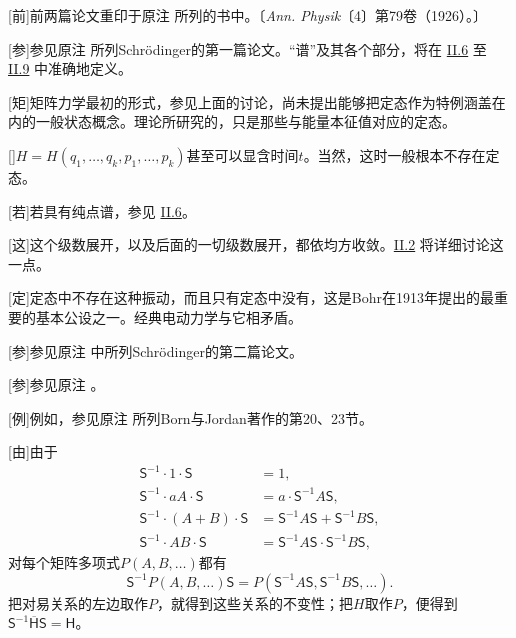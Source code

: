 \documentclass[fontsize=13pt,twoside,openany,headings=normal,parskip=false,bookmarkpackage=false,DIV=calc]{scrbook}
\begin{document}
[前]{前两篇论文重印于原注 \hyperlink{note-9}{} 所列的书中。〔\emph{Ann. Physik}〔4〕第79卷（1926）。〕}

[参]{参见原注 \hyperlink{note-16}{} 所列Schrödinger的第一篇论文。“谱”及其各个部分，将在 \hyperref[sec:II.6]{II.6} 至 \hyperref[sec:II.9]{II.9} 中准确地定义。}

[矩]{矩阵力学最初的形式，参见上面的讨论，尚未提出能够把定态作为特例涵盖在内的一般状态概念。\hypertarget{origpage-240}{}\label{origpage-240}理论所研究的，只是那些与能量本征值对应的定态。}

[]{$H=H(q_1,\allowbreak \ldots,\allowbreak q_k,\allowbreak p_1,\allowbreak \ldots,\allowbreak p_k)$甚至可以显含时间$t$。当然，这时一般根本不存在定态。}

[若]{若具有纯点谱，参见 \hyperref[sec:II.6]{II.6}。}

[这]{这个级数展开，以及后面的一切级数展开，都依均方收敛。\hyperref[sec:II.2]{II.2} 将详细讨论这一点。}

[定]{定态中不存在这种振动，而且只有定态中没有，这是Bohr在1913年提出的最重要的基本公设之一。经典电动力学与它相矛盾。}

[参]{参见原注 \hyperlink{note-16}{} 中所列Schrödinger的第二篇论文。}

[参]{参见原注 \hyperlink{note-7}{}。}

[例]{例如，参见原注 \hyperlink{note-1}{} 所列Born与Jordan著作的第20、23节。}

[由]{由于
\begin{align*}
\mathsf S^{-1}\cdot1\cdot\mathsf S&=1,\\
\mathsf S^{-1}\cdot aA\cdot\mathsf S&=a\cdot\mathsf S^{-1}A\mathsf S,\\
\mathsf S^{-1}\cdot(A+B)\cdot\mathsf S&=\mathsf S^{-1}A\mathsf S+\mathsf S^{-1}B\mathsf S,\\
\mathsf S^{-1}\cdot AB\cdot\mathsf S&=\mathsf S^{-1}A\mathsf S\cdot\mathsf S^{-1}B\mathsf S,
\end{align*}
对每个矩阵多项式$P(A,\allowbreak B,\allowbreak \ldots)$都有
\[
\mathsf S^{-1}P(A,B,\ldots)\mathsf S=P(\mathsf S^{-1}A\mathsf S,\mathsf S^{-1}B\mathsf S,\ldots).
\]
把对易关系的左边取作$P$，就得到这些关系的不变性；把$H$取作$P$，便得到$\mathsf S^{-1}\overline{\mathsf H}\mathsf S=\mathsf H$。}
\end{document}
